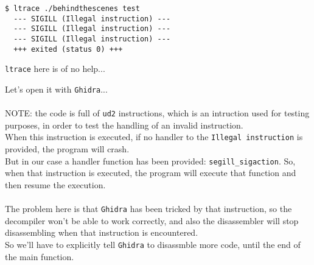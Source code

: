 \documentclass{article}
\begin{document}
\begin{lstlisting}
$ ltrace ./behindthescenes test     
  --- SIGILL (Illegal instruction) ---
  --- SIGILL (Illegal instruction) ---
  --- SIGILL (Illegal instruction) ---
  +++ exited (status 0) +++    
\end{lstlisting}

\noindent
\texttt{ltrace} here is of no help...

\noindent
Let's open it with \texttt{Ghidra}...\\
\\
NOTE: the code is full of \texttt{ud2} instructions, which is an intruction used for testing
purposes, in order to test the handling of an invalid instruction.\\
When this instruction is executed, if no handler to the \texttt{Illegal instruction} is provided, the
program will crash.\\
But in our case a handler function has been provided: \texttt{segill\_sigaction}.
So, when that instruction is executed, the program will execute that function and then resume the execution.\\
\\
The problem here is that \texttt{Ghidra} has been tricked by that instruction, so the decompiler won't be able to
work correctly, and also the disassembler will stop disassembling when that instruction is encountered.\\
So we'll have to explicitly tell \texttt{Ghidra} to disassmble more code, until the end of the main function.
\end{document}
